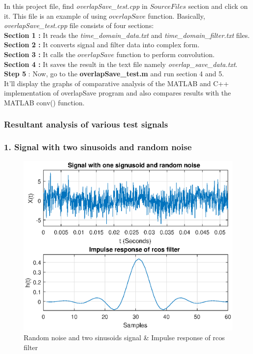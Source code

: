 In this project file, find \textit{overlapSave\_test.cpp} in $Source Files$ section and click on it. This file is an example of using $overlapSave$ function. Basically, \textit{overlapSave\_test.cpp} file consists of four sections:\\
\textbf{ Section 1 :} It reads the \textit{time\_domain\_data.txt} and \textit{ time\_domain\_filter.txt} files.\\
\textbf{ Section 2 :} It converts signal and filter data into complex form. \\
\textbf{ Section 3 :} It calls the $overlapSave$ function to perform convolution.\\
\textbf{ Section 4 :} It saves the result in the text file namely \textit{overlap\_save\_data.txt}.\\

\textbf{Step 5} : Now, go to the \textbf{overlapSave\_test.m} and run section 4 and 5.\\
It'll display the graphs of comparative analysis of the MATLAB and C++ implementation of overlapSave program and also compares results with the MATLAB conv() function.


\newpage
\subsubsection{Resultant analysis of various test signals}

\subsubsection{1. Signal with two sinusoids and random noise}
\begin{figure}[h]
	\centering
	\includegraphics[width=12cm]{./algorithms/overlap_save/figures/randomNoise.eps}
	\caption{Random noise and two sinusoids signal \& Impulse response of rcos filter}\label{randomNoise}
\end{figure}

